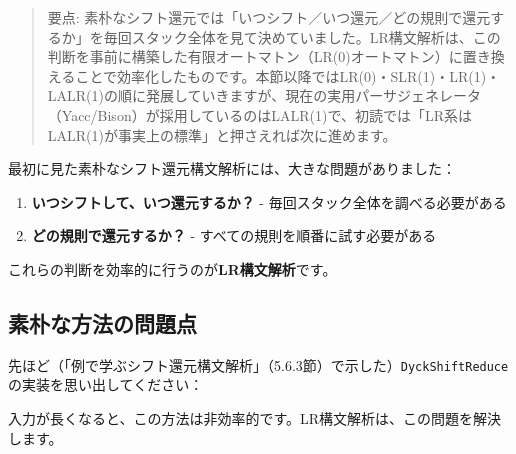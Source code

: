 \begin{quote}
要点:
素朴なシフト還元では「いつシフト／いつ還元／どの規則で還元するか」を毎回スタック全体を見て決めていました。LR構文解析は、この判断を事前に構築した有限オートマトン（LR(0)オートマトン）に置き換えることで効率化したものです。本節以降ではLR(0)・SLR(1)・LR(1)・LALR(1)の順に発展していきますが、現在の実用パーサジェネレータ（Yacc/Bison）が採用しているのはLALR(1)で、初読では「LR系はLALR(1)が事実上の標準」と押さえれば次に進めます。
\end{quote}

最初に見た素朴なシフト還元構文解析には、大きな問題がありました：

\begin{enumerate}
\def\labelenumi{\arabic{enumi}.}
\tightlist
\item
  \textbf{いつシフトして、いつ還元するか？} -
  毎回スタック全体を調べる必要がある
\item
  \textbf{どの規則で還元するか？} - すべての規則を順番に試す必要がある
\end{enumerate}

これらの判断を効率的に行うのが\textbf{LR構文解析}です。

\hypertarget{chapter5-ux7d20ux6734ux306aux65b9ux6cd5ux306eux554fux984cux70b9}{%
\subsection{素朴な方法の問題点}\label{chapter5-ux7d20ux6734ux306aux65b9ux6cd5ux306eux554fux984cux70b9}}

先ほど（「例で学ぶシフト還元構文解析」（5.6.3節）で示した）\texttt{DyckShiftReduce}の実装を思い出してください：

\begin{Shaded}
\begin{Highlighting}[]
  \NormalTok{() \{}
\NormalTok{        \}}
\NormalTok{    \}}
     \NormalTok{;}
\NormalTok{\}}
\end{Highlighting}
\end{Shaded}

入力が長くなると、この方法は非効率的です。LR構文解析は、この問題を解決します。

